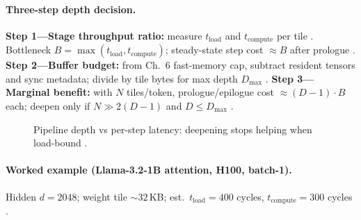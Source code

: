 \paragraph{Three-step depth decision.}
\textbf{Step 1---Stage throughput ratio:} measure $t_{\mathrm{load}}$ and $t_{\mathrm{compute}}$ per tile \citep{shah2024flashattention3,patel2025llminference}.
Bottleneck $B = \max(t_{\mathrm{load}}, t_{\mathrm{compute}})$; steady-state step cost $\approx B$ after prologue \citep{semianalysis2024tma,dao2022flashattention}.
\textbf{Step 2---Buffer budget:} from Ch.~6 fast-memory cap, subtract resident tensors and sync metadata; divide by tile bytes for max depth $D_{\max}$ \citep{yirage2026,chen2020compilerbasedhardw,dao2022flashattention}.
\textbf{Step 3---Marginal benefit:} with $N$ tiles/token, prologue/epilogue cost $\approx (D-1)\cdot B$ each; deepen only if $N \gg 2(D-1)$ and $D \le D_{\max}$ \citep{patel2025llminference,memoryfloor2026,taxbreak2026}.

\begin{figure}[t]
\centering
{}
\caption{Pipeline depth vs per-step latency: deepening stops helping when load-bound \citep{semianalysis2024tma,memoryfloor2026}.}
\label{fig:ch08_depth_latency}
\end{figure}

\paragraph{Worked example (Llama-3.2-1B attention, H100, batch-1).}
Hidden $d{=}2048$; weight tile ${\sim}32$\,KB; est.\ $t_{\mathrm{load}}{=}400$ cycles, $t_{\mathrm{compute}}{=}300$ cycles \citep{taxbreak2026,shah2024flashattention3,kwon2023vllm}.

